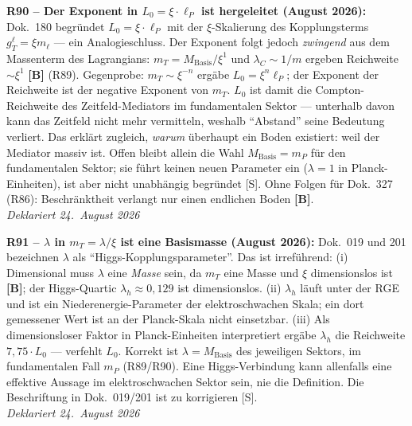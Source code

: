 \medskip
\textbf{R90 -- Der Exponent in $L_0 = \xi\cdot\ell_P$ ist hergeleitet (August 2026):}
Dok.~180 begr\"undet $L_0 = \xi\cdot\ell_P$ mit der $\xi$-Skalierung des Kopplungsterms $g_T^\ell = \xi m_\ell$ --- ein Analogieschluss.
Der Exponent folgt jedoch \emph{zwingend} aus dem Massenterm des Lagrangians: $m_T = M_\mathrm{Basis}/\xi^1$ und $\lambda_C \sim 1/m$ ergeben Reichweite $\sim\xi^1$ \textbf{[B]} (R89).
Gegenprobe: $m_T \sim \xi^{-n}$ erg\"abe $L_0 = \xi^n\ell_P$; der Exponent der Reichweite ist der negative Exponent von $m_T$.
$L_0$ ist damit die Compton-Reichweite des Zeitfeld-Mediators im fundamentalen Sektor --- unterhalb davon kann das Zeitfeld nicht mehr vermitteln, weshalb \enquote{Abstand} seine Bedeutung verliert. Das erkl\"art zugleich, \emph{warum} \"uberhaupt ein Boden existiert: weil der Mediator massiv ist.
Offen bleibt allein die Wahl $M_\mathrm{Basis} = m_P$ f\"ur den fundamentalen Sektor; sie f\"uhrt keinen neuen Parameter ein ($\lambda = 1$ in Planck-Einheiten), ist aber nicht unabh\"angig begr\"undet [S].
Ohne Folgen f\"ur Dok.~327 (R86): Beschr\"anktheit verlangt nur einen endlichen Boden \textbf{[B]}.\\
\emph{Deklariert 24.~August 2026}

\medskip
\textbf{R91 -- $\lambda$ in $m_T = \lambda/\xi$ ist eine Basismasse (August 2026):}
Dok.~019 und 201 bezeichnen $\lambda$ als \enquote{Higgs-Kopplungsparameter}. Das ist irref\"uhrend:
(i) Dimensional muss $\lambda$ eine \emph{Masse} sein, da $m_T$ eine Masse und $\xi$ dimensionslos ist \textbf{[B]}; der Higgs-Quartic $\lambda_h \approx 0{,}129$ ist dimensionslos.
(ii) $\lambda_h$ l\"auft unter der RGE und ist ein Niederenergie-Parameter der elektroschwachen Skala; ein dort gemessener Wert ist an der Planck-Skala nicht einsetzbar.
(iii) Als dimensionsloser Faktor in Planck-Einheiten interpretiert erg\"abe $\lambda_h$ die Reichweite $7{,}75\cdot L_0$ --- verfehlt $L_0$.
Korrekt ist $\lambda = M_\mathrm{Basis}$ des jeweiligen Sektors, im fundamentalen Fall $m_P$ (R89/R90).
Eine Higgs-Verbindung kann allenfalls eine effektive Aussage im elektroschwachen Sektor sein, nie die Definition. Die Beschriftung in Dok.~019/201 ist zu korrigieren [S].\\
\emph{Deklariert 24.~August 2026}

